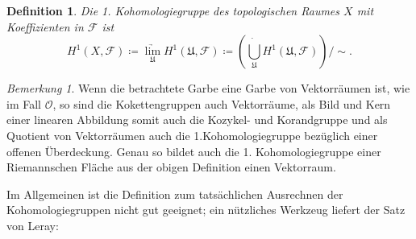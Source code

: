 \documentclass[11pt,a4paper,toc=bibliography]{scrartcl}
\theoremstyle{thm}
\theoremstyle{def}
\newtheorem{defi}{Definition}[section]
\theoremstyle{remark}
\newtheorem*{bem}{Bemerkung}
\begin{document}
\begin{defi}
Die \emph{1. Kohomologiegruppe} des topologischen Raumes $X$ mit Koeffizienten in $\mathcal{F}$ ist
$$
H^1(X,\mathcal{F}) \coloneqq \underset{\mathfrak{U}}{\underrightarrow{\lim}} H^1(\mathfrak{U},\mathcal{F})\coloneqq \left( \dot{\bigcup_{\mathfrak{U}}} H^1(\mathfrak{U},\mathcal{F})\right) /\sim.
$$
\end{defi}
\begin{bem}
Wenn die betrachtete Garbe eine Garbe von Vektorräumen ist, wie im Fall $\mathcal{O}$, so sind die Kokettengruppen auch Vektorräume, als Bild und Kern einer linearen Abbildung somit auch die Kozykel- und Korandgruppe und als Quotient von Vektorräumen auch die 1.Kohomologiegruppe bezüglich einer offenen Überdeckung. Genau so bildet auch die 1. Kohomologiegruppe einer Riemannschen Fläche aus der obigen Definition einen Vektorraum.
\end{bem}
Im Allgemeinen ist die Definition zum tatsächlichen Ausrechnen der Kohomologiegruppen nicht gut geeignet; ein nützliches Werkzeug liefert der Satz von Leray:
\end{document}

